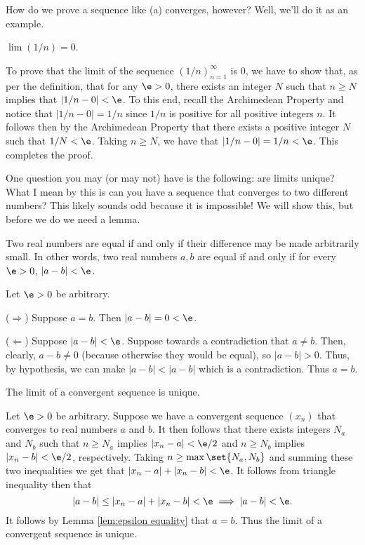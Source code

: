 \documentclass[class=article, crop=false]{standalone}
\begin{document}
How do we prove a sequence like (a) converges, however? Well, we'll do it as an example.
\begin{ex}
    $\lim (1/n) = 0$.
\end{ex}
\begin{pf}
    To prove that the limit of the sequence $(1/n)_{n=1}^\infty$ is 0, we have to show that, as per the definition, that for any $\e > 0$, there exists an integer $N$ such that $n \geq N$ implies that $|1/n-0| < \e$. To this end, recall the Archimedean Property and notice that $|1/n-0| = 1/n$ since $1/n$ is positive for all positive integers $n$. It follows then by the Archimedean Property that there exists a positive integer $N$ such that $1/N < \e$. Taking $n \geq N$, we have that $|1/n-0| = 1/n < \e$. This completes the proof.
\end{pf}

One question you may (or may not) have is the following: are limits unique? What I mean by this is can you have a sequence that converges to two different numbers? This likely sounds odd because it is impossible! We will show this, but before we do we need a lemma.
\begin{lem}{\label{lem:epsilon equality}}
    Two real numbers are equal if and only if their difference may be made arbitrarily small. In other words, two real numbers $a,b$ are equal if and only if for every $\e > 0$, $|a-b| < \e$.
\end{lem}
\begin{pf}
    Let $\e > 0$ be arbitrary.

    ($\Rightarrow$) Suppose $a=b$. Then $|a-b| = 0 < \e$.

    ($\Leftarrow$) Suppose $|a-b| < \e$. Suppose towards a contradiction that $a\neq b$. Then, clearly, $a-b \neq 0$ (because otherwise they would be equal), so $|a-b| > 0$. Thus, by hypothesis, we can make $|a-b| < |a-b|$ which is a contradiction. Thus $a=b$.
\end{pf}

\begin{thm}
    The limit of a convergent sequence is unique.
\end{thm}
\begin{pf}
    Let $\e > 0$ be arbitrary. Suppose we have a convergent sequence $(x_n)$ that converges to real numbers $a$ and $b$. It then follows that there exists integers $N_a$ and $N_b$ such that $n \geq N_a$ implies $|x_n-a| < \e/2$ and $n \geq N_b$ implies $|x_n-b| < \e/2$, respectively. Taking $n \geq \max\set{N_a, N_b}$ and summing these two inequalities we get that $|x_n-a| + |x_n-b| < \e$. It follows from triangle inequality then that
        \[
            |a-b| \leq |x_n-a| + |x_n-b| < \e \implies |a-b| < \e.
        \]
    It follows by Lemma \ref{lem:epsilon equality} that $a=b$. Thus the limit of a convergent sequence is unique.
\end{pf}
\end{document}
